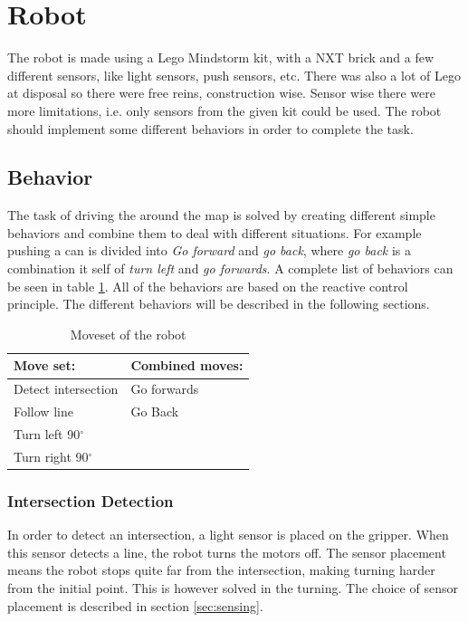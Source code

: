\section{Robot} 

The robot is made using a Lego Mindstorm kit, with a NXT brick and a few different sensors, like light sensors, push sensors, etc. There was also a lot of Lego at disposal so there were free reins, construction wise. Sensor wise there were more limitations, i.e. only sensors from the given kit could be used. The robot should implement some different behaviors in order to complete the task.

\subsection{Behavior} \label{sec:behavior}
The task of driving the around the map is solved by creating different simple behaviors and combine them to deal with different situations. For example pushing a can is divided into \textit{Go forward} and \textit{go back}, where \textit{go back} is a combination it self of \textit{turn left} and \textit{go forwards}. A complete list of behaviors can be seen in table \ref{tab:movset}. All of the behaviors are based on the reactive control principle. The different behaviors will be described in the following sections.

\begin{table}[H]
\centering
 \begin{tabular}{|l|l|}
  \hline
  Move set: &  Combined moves: \\
  \hline
   Detect intersection & Go forwards\\
   Follow line & Go Back\\
   Turn left 90$^{\circ}$  &\\
   Turn right 90$^{\circ}$ & \\
   \hline
 \end{tabular}
\caption{Moveset of the robot}
\label{tab:movset}
\end{table}

\subsubsection{Intersection Detection}
In order to detect an intersection, a light sensor is placed on the gripper. When this sensor detects a line, the robot turns the motors off. 
The sensor placement means the robot stops quite far from the intersection, making turning harder from the initial point.
This is however solved in the turning.
The choice of sensor placement is described in section \ref{sec:sensing}.

